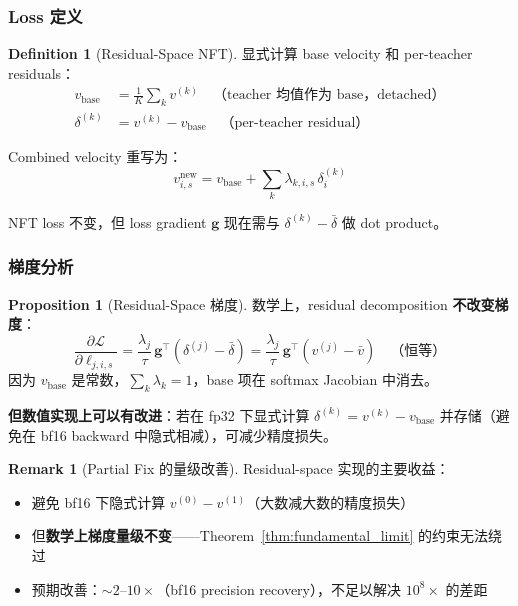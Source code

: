 \documentclass[11pt,a4paper]{article}
\newcommand{\loss}{\mathcal{L}}
\theoremstyle{definition}
\newtheorem{definition}{Definition}
\newtheorem{remark}{Remark}
\newtheorem{proposition}{Proposition}
\begin{document}
\subsubsection{Loss 定义}

\begin{definition}[Residual-Space NFT]
显式计算 base velocity 和 per-teacher residuals：
\begin{align}
v_{\mathrm{base}} &= \frac{1}{K}\sum_k v^{(k)} \quad\text{（teacher 均值作为 base，detached）} \\
\delta^{(k)} &= v^{(k)} - v_{\mathrm{base}} \quad\text{（per-teacher residual）}
\end{align}

Combined velocity 重写为：
\begin{equation}
v^{\mathrm{new}}_{i,s} = v_{\mathrm{base}} + \sum_k \lambda_{k,i,s}\, \delta^{(k)}_i
\end{equation}

NFT loss 不变，但 loss gradient $\mathbf{g}$ 现在需与 $\delta^{(k)} - \bar{\delta}$ 做 dot product。
\end{definition}

\subsubsection{梯度分析}

\begin{proposition}[Residual-Space 梯度]
数学上，residual decomposition \textbf{不改变梯度}：
\begin{equation}
\frac{\partial \loss}{\partial \ell_{j,i,s}} = \frac{\lambda_j}{\tau}\,\mathbf{g}^\top\left(\delta^{(j)} - \bar{\delta}\right) = \frac{\lambda_j}{\tau}\,\mathbf{g}^\top\left(v^{(j)} - \bar{v}\right) \quad\text{（恒等）}
\end{equation}
因为 $v_{\mathrm{base}}$ 是常数，$\sum_k \lambda_k = 1$，base 项在 softmax Jacobian 中消去。

\textbf{但数值实现上可以有改进}：若在 fp32 下显式计算 $\delta^{(k)} = v^{(k)} - v_{\mathrm{base}}$ 并存储（避免在 bf16 backward 中隐式相减），可减少精度损失。
\end{proposition}

\begin{remark}[Partial Fix 的量级改善]
Residual-space 实现的主要收益：
\begin{itemize}[leftmargin=1em]
\item 避免 bf16 下隐式计算 $v^{(0)} - v^{(1)}$（大数减大数的精度损失）
\item 但\textbf{数学上梯度量级不变}——Theorem~\ref{thm:fundamental_limit} 的约束无法绕过
\item 预期改善：$\sim 2$--$10\times$（bf16 precision recovery），不足以解决 $10^8\times$ 的差距
\end{itemize}
\end{remark}
\end{document}
